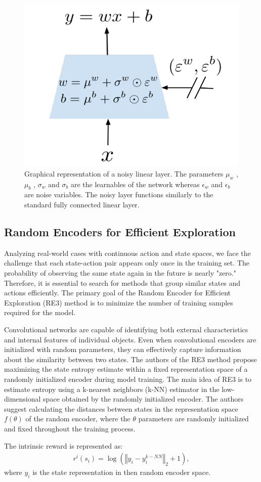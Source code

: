 \documentclass{article}
\begin{document}
\begin{figure} [!ht]
	\centering
	\includegraphics[width=0.35\linewidth]{figure/NoiseNet.png}
	\caption{Graphical representation of a noisy linear layer. The parameters $\mu_w$ , $\mu_b$ , $\sigma_w$ and $\sigma_b$ are the learnables of the network whereas $\epsilon_w$ and $\epsilon_b$ are noise variables. The noisy layer functions similarly to the standard fully connected linear layer.}
	\label{fig:enter-label}
\end{figure}
\subsection{Random Encoders for Efficient Exploration}
Analyzing real-world cases with continuous action and state spaces, we face the challenge that each state-action pair appears only once in the training set. The probability of observing the same state again in the future is nearly "zero." Therefore, it is essential to search for methods that group similar states and actions efficiently. The primary goal of the Random Encoder for Efficient Exploration (RE3) method is to minimize the number of training samples required for the model.

Convolutional networks are capable of identifying both external characteristics and internal features of individual objects. Even when convolutional encoders are initialized with random parameters, they can effectively capture information about the similarity between two states. The authors of the RE3 method propose maximizing the state entropy estimate within a fixed representation space of a randomly initialized encoder during model training. The main idea of RE3 is to estimate entropy using a k-nearest neighbors (k-NN) estimator in the low-dimensional space obtained by the randomly initialized encoder. The authors suggest calculating the distances between states in the representation space $f(\theta)$ of the random encoder, where the $\theta$ parameters are randomly initialized and fixed throughout the training process.

The intrinsic reward is represented as:
\begin{align*}
	r^i(s_i) = \log\left(\left\Vert y_i-y_i^{k-NN}\right\Vert_2+1\right),
\end{align*}
where $y_i$ is the state representation in then random encoder space.
\end{document}
